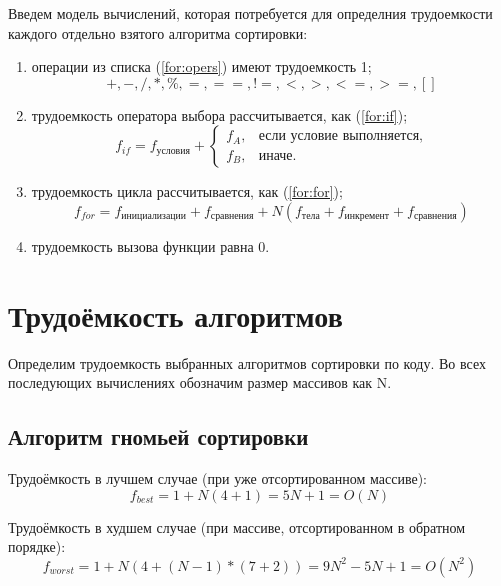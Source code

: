 Введем модель вычислений, которая потребуется для определния трудоемкости каждого отдельно взятого алгоритма сортировки:
\begin{enumerate}
	\item операции из списка (\ref{for:opers}) имеют трудоемкость 1;
	\begin{equation}
		\label{for:opers}
		+, -, /, *, \%, =, ==, !=, <, >, <=, >=, []
	\end{equation}
	\item трудоемкость оператора выбора  рассчитывается, как (\ref{for:if});
	\begin{equation}
		\label{for:if}
		f_{if} = f_{\text{условия}} +
		\begin{cases}
			f_A, & \text{если условие выполняется,}\\
			f_B, & \text{иначе.}
		\end{cases}
	\end{equation}
	\item трудоемкость цикла рассчитывается, как (\ref{for:for});
	\begin{equation}
		\label{for:for}
		f_{for} = f_{\text{инициализации}} + f_{\text{сравнения}} + N(f_{\text{тела}} + f_{\text{инкремент}} + f_{\text{сравнения}})
	\end{equation}
	\item трудоемкость вызова функции равна 0.
\end{enumerate}

\section{Трудоёмкость алгоритмов}

Определим трудоемкость выбранных алгоритмов сортировки по коду. Во всех последующих вычислениях обозначим размер массивов как N.

\subsection{Алгоритм гномьей сортировки}

Трудоёмкость в лучшем случае (при уже отсортированном массиве):
\begin{equation}
	\label{for:gnome_best}
    f_{best} = 1 + N(4 + 1) = 5N + 1 = O(N)
\end{equation}

Трудоёмкость в худшем случае (при массиве, отсортированном в обратном порядке):
\begin{equation}
	\label{for:gnome_worst}
    f_{worst} = 1 + N(4 + (N - 1) * (7 + 2)) = 9N^2 - 5N + 1 = O(N^2)
\end{equation}

